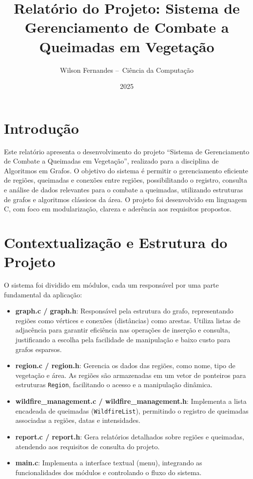 \documentclass{article}
\begin{document}
\title{Relatório do Projeto: Sistema de Gerenciamento de Combate a Queimadas em Vegetação}
\author{Wilson Fernandes --~Ciência da Computação}
\date{2025}

\maketitle

\section{Introdução}

Este relatório apresenta o desenvolvimento do projeto ``Sistema de Gerenciamento de Combate a Queimadas em Vegetação'', realizado para a disciplina de Algoritmos em Grafos. O objetivo do sistema é permitir o gerenciamento eficiente de regiões, queimadas e conexões entre regiões, possibilitando o registro, consulta e análise de dados relevantes para o combate a queimadas, utilizando estruturas de grafos e algoritmos clássicos da área. O projeto foi desenvolvido em linguagem C, com foco em modularização, clareza e aderência aos requisitos propostos.

\section{Contextualização e Estrutura do Projeto}

O sistema foi dividido em módulos, cada um responsável por uma parte fundamental da aplicação:

\begin{itemize}
    \item \textbf{graph.c / graph.h}: Responsável pela estrutura do grafo, representando regiões como vértices e conexões (distâncias) como arestas. Utiliza listas de adjacência para garantir eficiência nas operações de inserção e consulta, justificando a escolha pela facilidade de manipulação e baixo custo para grafos esparsos.
    \item \textbf{region.c / region.h}: Gerencia os dados das regiões, como nome, tipo de vegetação e área. As regiões são armazenadas em um vetor de ponteiros para estruturas \texttt{Region}, facilitando o acesso e a manipulação dinâmica.
    \item \textbf{wildfire\_management.c / wildfire\_management.h}: Implementa a lista encadeada de queimadas (\texttt{WildfireList}), permitindo o registro de queimadas associadas a regiões, datas e intensidades.
    \item \textbf{report.c / report.h}: Gera relatórios detalhados sobre regiões e queimadas, atendendo aos requisitos de consulta do projeto.
    \item \textbf{main.c}: Implementa a interface textual (menu), integrando as funcionalidades dos módulos e controlando o fluxo do sistema.
\end{itemize}
\end{document}
